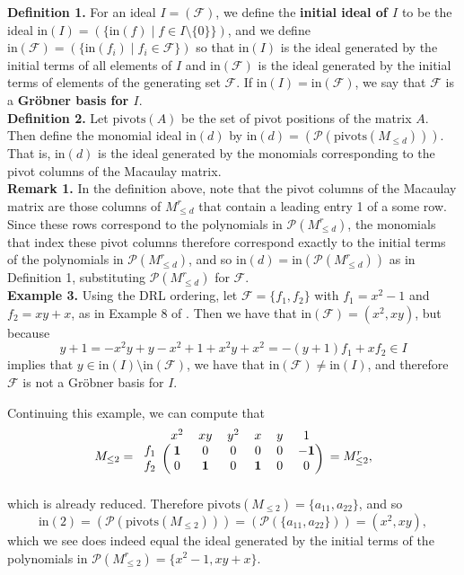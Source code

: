 \documentclass[12pt]{article}
\newcommand{\init}{\text{in}}
\newcommand{\Poly}{\mathscr{P}}
\newcommand{\piv}{\text{pivots}}
\newcommand{\F}{\mathcal{F}}
\begin{document}
\noindent \textbf{Definition 1.} For an ideal $I = (\F)$, we define the \textbf{initial ideal of $I$} to be the ideal $\init(I) = (\{\init(f) \mid f \in I \setminus \{0\}\})$, and we define $\init(\F) = (\{\init(f_i) \mid f_i \in \F\})$ so that $\init(I)$ is the ideal generated by the initial terms of all elements of $I$ and $\init(\F)$ is the ideal generated by the initial terms of elements of the generating set $\F$. If $\init(I) = \init(\F)$, we say that $\F$ is a \textbf{Gröbner basis for $I$}.  \\

\noindent \textbf{Definition 2.} Let $\piv(A)$ be the set of pivot positions of the matrix $A$. Then define the monomial ideal $\init(d)$ by $\init(d) = (\Poly(\piv(M_{\leq d})))$. That is, $\init(d)$ is the ideal generated by the monomials corresponding to the pivot columns of the Macaulay matrix. \\

\noindent \textbf{Remark 1.} In the definition above, note that the pivot columns of the Macaulay matrix are those columns of $M_{\leq d}^r$ that contain a leading entry 1 of a some row. Since these rows correspond to the polynomials in $\Poly(M_{\leq d}^r)$, the monomials that index these pivot columns therefore correspond exactly to the initial terms of the polynomials in $\Poly(M_{\leq d}^r)$, and so $\init(d) = \init(\Poly(M_{\leq d}^r))$ as in Definition 1, substituting $\Poly(M_{\leq d}^r)$ for $\F$. \\

\noindent \textbf{Example 3.} Using the DRL ordering, let $\F = \{f_1, f_2\}$ with $f_1 = x^2 - 1$ and $f_2 = xy + x$, as in Example 8 of \cite{caminata2020solving}. Then we have that $\init(\F) = (x^2, xy)$, but because \[ y + 1 = -x^2y + y - x^2 + 1 + x^2y + x^2 = -(y + 1) f_1 + x f_2 \in I \] implies that $y \in \init(I) \setminus \init(\F)$, we have that $\init(\F) \neq \init(I)$, and therefore $\F$ is not a Gröbner basis for $I$. 

Continuing this example, we can compute that \[ M_{\leq 2} = \begin{blockarray}{ccccccc}
    & x^2 & xy & y^2 & x & y & 1 \\
    \begin{block}{c(cccccc)}
        f_1 & \mathbf{1} & 0 & 0 & 0 & 0 & \mathbf{-1} \\
        f_2 & 0 & \mathbf{1} & 0 & \mathbf{1} & 0 & 0 \\
    \end{block}
\end{blockarray} \,\, = M_{\leq 2}^r, \] which is already reduced. Therefore $\piv(M_{\leq 2}) = \{a_{11}, a_{22}\}$, and so \[ \init(2) = (\Poly(\piv(M_{\leq 2}))) = (\Poly(\{a_{11}, a_{22}\})) = (x^2, xy), \] which we see does indeed equal the ideal generated by the initial terms of the polynomials in $\Poly(M_{\leq 2}^r) = \{x^2 - 1, xy + x\}$. 
\end{document}
